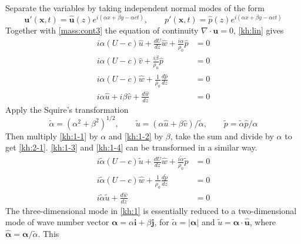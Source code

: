 Separate the variables by taking independent normal modes of the
form
\begin{equation}\label{kh:modes}
    \mathbf{u}'(\mathbf{x},t)=\hat{\mathbf{u}}(z)e^{i(\alpha x+\beta y-\alpha c t)},\qquad
    p'(\mathbf{x},t)=\hat{p}(z)e^{i(\alpha x+\beta y-\alpha c t)}
\end{equation}
\newslide
Together with \eqref{mass:cont3} the equation of continuity
$\nabla\cdot\mathbf{u}=0$, \eqref{kh:lin} gives
\begin{subequations}\label{kh:1}
\begin{align}
i\alpha(U-c)\hat{u}+\frac{dU}{dz}\hat{w}+\frac{i\alpha}{\rho_0}\hat{p}&=0\label{kh:1-1}\\
i\alpha(U-c)\hat{v}+\frac{i\beta}{\rho_0}\hat{p}&=0\label{kh:1-2}\\
i\alpha(U-c)\hat{w}+\frac{1}{\rho_0}\frac{d\hat{p}}{dz}&=0\label{kh:1-3}\\
i\alpha\hat{u}+i\beta\hat{v}+\frac{d\hat{w}}{dz}&=0\label{kh:1-4}
\end{align}
\end{subequations}
\newslide
Apply the Squire's transformation
\begin{equation}\label{kh:squire}
    \tilde{\alpha}=(\alpha^2+\beta^2)^{1/2},\qquad
\tilde{u}=(\alpha\hat{u}+\beta\hat{v})/\tilde{\alpha},\qquad
\tilde{p}=\tilde{\alpha}\hat{p}/\alpha
\end{equation}
Then multiply \eqref{kh:1-1} by $\alpha$ and \eqref{kh:1-2} by
$\beta$, take the sum and divide by $\alpha$ to get \eqref{kh:2-1}.
\eqref{kh:1-3} and \eqref{kh:1-4} can be transformed in a similar
way.
\begin{subequations}\label{kh:2}
\begin{align}
i\tilde{\alpha}(U-c)\tilde{u}+\frac{dU}{dz}\hat{w}+\frac{i\tilde{\alpha}}{\rho_0}\tilde{p}&=0\label{kh:2-1}\\
i\tilde{\alpha}(U-c)\hat{w}+\frac{1}{\rho_0}\frac{d\tilde{p}}{dz}&=0\label{kh:2-2}\\
i\tilde{\alpha}\tilde{u}+\frac{d\hat{w}}{dz}&=0\label{kh:2-3}
\end{align}
\end{subequations}
\newslide
The three-dimensional mode in \eqref{kh:1} is essentially reduced to
a two-dimensional mode of wave number vector
$\boldsymbol{\alpha}=\alpha\mathbf{i}+\beta\mathbf{j}$, for
$\tilde{\alpha}=\lvert\boldsymbol{\alpha}\rvert$ and
$\tilde{u}=\hat{\boldsymbol{\alpha}}\cdot\hat{\mathbf{u}}$, where
$\hat{\boldsymbol{\alpha}}=\boldsymbol{\alpha}/\tilde{\alpha}$. This
